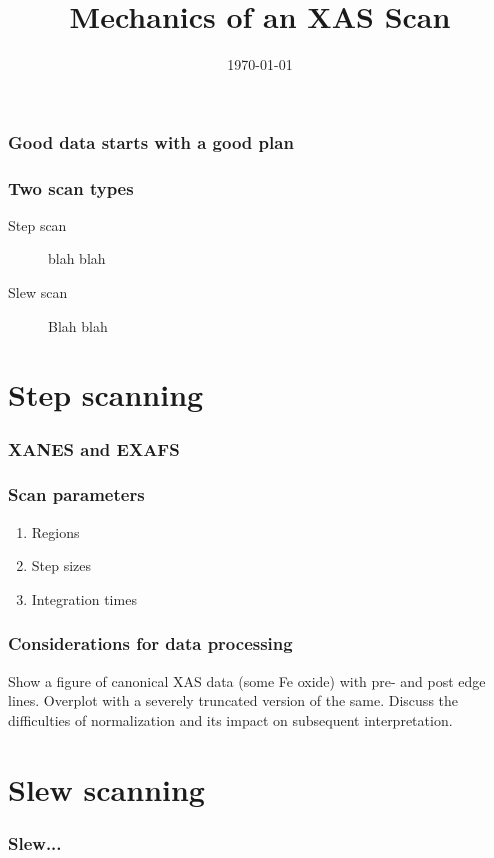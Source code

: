 \documentclass[10pt, xcolor=x11names, compress]{beamer}
\title{Mechanics of an XAS Scan}
\date[\today]{\today}
\begin{document}
\maketitle


\begin{frame}
  \frametitle{Good data starts with a good plan}
  
\end{frame}

\begin{frame}
  \frametitle{Two scan types}
  \begin{description}
  \item[Step scan] blah blah
  \item[Slew scan] Blah blah
  \end{description}
\end{frame}

\section{Step scanning}

\begin{frame}
  \frametitle{XANES and EXAFS}
  
\end{frame}

\begin{frame}
  \frametitle{Scan parameters}
  \begin{enumerate}
  \item Regions
  \item Step sizes
  \item Integration times
  \end{enumerate}
\end{frame}

\begin{frame}
  \frametitle{Considerations for data processing}
  Show a figure of canonical XAS data (some Fe oxide) with pre- and
  post edge lines.  Overplot with a severely truncated version of the
  same.  Discuss the difficulties of normalization and its impact on
  subsequent interpretation.
\end{frame}

\section{Slew scanning}

\begin{frame}
  \frametitle{Slew...}
  
\end{frame}
\end{document}
